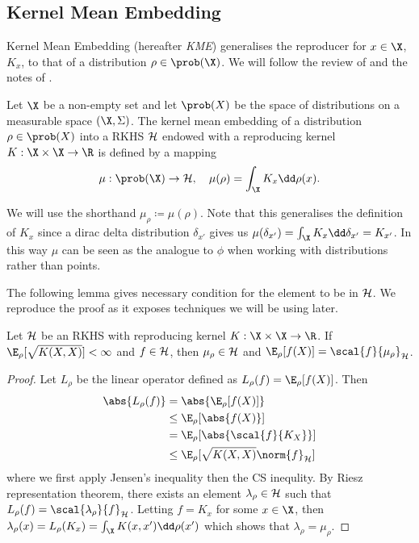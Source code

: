 \subsection{Kernel Mean Embedding} Kernel Mean Embedding (hereafter \emph{KME})
generalises the reproducer for \(x \in \X\), \(K_{x}\), to that of a
distribution \(\rho \in \prob(\X)\). We will follow the review of
\cite{muandet17_kernel_mean_embed_distr} and the notes of
\cite{gretton18_advan_topic_machin_learn}.

\begin{definition}
  \label{def:kernel-mean-embedding} Let \(\X\) be a non-empty set and let
\(\prob(X)\) be the space of distributions on a measurable space \((\X,
\Sigma)\). The kernel mean embedding of a distribution \(\rho \in \prob(X)\)
into a RKHS \(\mathcal{H}\) endowed with a reproducing kernel \(K: \X \times \X \to
\R\) is defined by a mapping
  \begin{equation}
    \label{eq:kernel-mean-embedding} \mu : \prob(\X) \to \rkhs{H}, \quad
\mu(\rho) = \int_{\X} K_{x} \dd \rho(x).
  \end{equation}
\end{definition} We will use the shorthand \(\mu_{\rho} \coloneqq \mu(\rho)\).
Note that this generalises the definition of \(K_{x}\) since a dirac delta
distribution \(\delta_{x'}\) gives us \(\mu(\delta_{x'}) = \int_{\X}K_{x} \dd
\delta_{x'} = K_{x'}\). In this way \(\mu\) can be seen as the analogue to
\(\phi\) when working with distributions rather than points.

The following lemma gives necessary condition for the element to be in
\(\mathcal{H}\). We reproduce the proof as it exposes techniques we will be using
later.

\begin{theorem} Let \(\mathcal{H}\) be an RKHS with reproducing kernel \(K: \X
\times \X \to \R\). If \(\E_{\rho}[\sqrt{K(X, X)}] < \infty\) and \(f \in
\mathcal{H}\), then \(\mu_{\rho} \in \mathcal{H}\) and \(\E_{\rho}[f(X)] =
\scal{f}{\mu_{\rho}}_{\rkhs{H}}\).
\end{theorem}

\begin{proof} Let \(L_{\rho}\) be the linear operator defined as \(L_{\rho}(f) =
\E_{\rho}[f(X)]\). Then
  \begin{align*} \abs{ L_{\rho}(f) } & = \abs{\E_{\rho}[f(X)]} \\ & \leq
\E_{\rho}[\abs{f(X)}] \\ & = \E_{\rho}[\abs{\scal{f}{K_{X}}}] \\ & \leq
\E_{\rho}[\sqrt{K(X, X)} \norm{f}_{\rkhs{H}}]
  \end{align*} where we first apply Jensen's inequality then the CS inequlity.
By Riesz representation theorem, there exists an element \(\lambda_{\rho} \in
\mathcal{H}\) such that \(L_{\rho}(f) = \scal{\lambda_{\rho}}{f}_{\rkhs{H}}\).
Letting \(f = K_{x}\) for some \(x \in \X\), then \(\lambda_{\rho}(x) =
L_{\rho}(K_{x}) = \int_{\X} K(x, x') \dd \rho(x')\) which shows that
\(\lambda_{\rho} = \mu_{\rho}\).
\end{proof}

